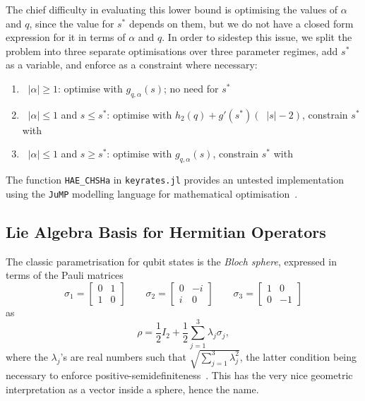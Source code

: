 \documentclass[10pt, a4paper]{article}
\numberwithin{equation}{section} %
\theoremstyle{definition}
\theoremstyle{plain}
\newcommand{\abs}[1]{\mathop{}\left\lvert#1\right\rvert}
\newcommand{\?}{\mathrel{?}} %
\begin{document}
\begin{appendices}
                          The chief difficulty in evaluating this lower bound is optimising the values of \(\alpha\) and \(q\), since the value for \(s^*\) depends on them, but we do not have a closed form expression for it in terms of \(\alpha\) and \(q\). In order to sidestep this issue, we split the problem into three separate optimisations over three parameter regimes, add \(s^*\) as a variable, and enforce  as a constraint where necessary:
                          \begin{enumerate}
                            \item \(\abs{\alpha} \geq 1\): optimise with \(g_{q,\alpha}(s)\); no need for \(s^*\)
                            \item \(\abs{\alpha} \leq 1\) and \(s \leq s^*\): optimise with \(h_2(q) + g'(s^*)(\abs{s}-2)\), constrain \(s^*\) with 
                            \item \(\abs{\alpha} \leq 1\) and \(s \geq s^*\): optimise with \(g_{q,\alpha}(s)\), constrain \(s^*\) with 
                          \end{enumerate}

                          The function \verb`HAE_CHSHa` in \verb`keyrates.jl` provides an untested implementation using the \verb`JuMP` modelling language for mathematical optimisation~\cite{JuMP}.

                          \subsection{Lie Algebra Basis for Hermitian Operators}\label{sec:addtech_liealg}

                          The classic parametrisation for qubit states is the \emph{Bloch sphere}, expressed in terms of the Pauli matrices
                          \begin{equation}
                            \sigma_1 = \begin{bmatrix} 0 & 1 \\ 1 &  0 \end{bmatrix} \qquad \sigma_2 = \begin{bmatrix} 0 & -i \\ i & 0 \end{bmatrix} \qquad \sigma_3 = \begin{bmatrix} 1 & 0 \\ 0 & -1 \end{bmatrix}
                          \end{equation}
                          as
                          \begin{equation}
                            \rho = \frac{1}{2}I_2 + \frac{1}{2} \sum_{j=1}^3 \lambda_j \sigma_j,
                          \end{equation}
                          where the \(\lambda_j\)'s are real numbers such that \(\sqrt{\sum_{j=1}^3 \lambda_j^2}\), the latter condition being necessary to enforce positive-semidefiniteness~\cite{DensMatParam}. This has the very nice geometric interpretation as a vector inside a sphere, hence the name.


\end{appendices}
\end{document}
